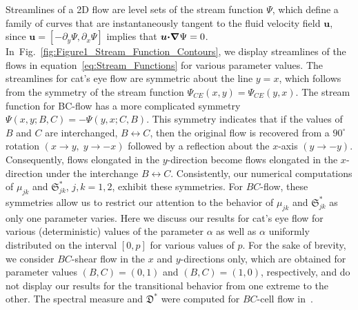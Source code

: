 \documentclass[english,12pt,jmp,graphicx]{revtex4-1}
\newcommand{\vecu}{\boldsymbol{u}}
\newcommand{\figref}[1]{Fig.~\ref{#1}}
\newcommand{\bnabla}{\mbox{\boldmath${\nabla}$}}
\newcommand{\bcdot}{\mbox{\boldmath${\cdot}$}}
\newcommand{\Vc}{\mathcal{V}}
\newcommand{\Sg}{\mathfrak{S}}
\newcommand{\Dg}{\mathfrak{D}}
\newcommand{\Hc}{\mathcal{H}}
\begin{document}
Streamlines of a 2D flow are level sets of the stream function
$\Psi$, which define a family of curves that are instantaneously tangent
to the fluid velocity field $\vecu$, since $\vecu=[-\partial_y\Psi,\partial_x\Psi]$
implies that
$\vecu\bcdot\bnabla\Psi=0$. In~\figref{fig:Figure1_Stream_Function_Contours},   
we display streamlines of the flows
in equation~\eqref{eq:Stream_Functions} for various parameter values.
The streamlines for cat's eye flow are symmetric
about the line $y=x$, which follows from the symmetry of the stream
function $\Psi_{CE}(x,y)=\Psi_{CE}(y,x)$. The stream function
for BC-flow has a more complicated symmetry
$\Psi(x,y;B,C)=-\Psi(y,x;C,B)$. This symmetry indicates that if the values
of $B$ and $C$ are interchanged, $B\longleftrightarrow C$, then the original flow is
recovered from a $90^\circ$ rotation $(x\to y,\;y\to-x)$ followed by a
reflection about the $x$-axis $(y\to-y)$. Consequently, flows elongated
in the $y$-direction become flows elongated in the $x$-direction under
the interchange $B\longleftrightarrow C$. Consistently, our numerical
computations of $\mu_{jk}$ and $\Sg_{jk}^*$, $j,k=1,2$, exhibit these
symmetries. For $BC$-flow, these symmetries allow us to restrict our
attention to the behavior of $\mu_{jk}$ and $\Sg_{jk}^*$ as only one
parameter varies. Here we discuss our results for cat's eye flow for
various (deterministic) values of the parameter $\alpha$ as well as $\alpha$ uniformly
distributed on the interval $[0,p]$ for various values of $p$.
For the sake of brevity, we consider $BC$-shear flow in the $x$ and
$y$-directions only, which are obtained for parameter values
$(B,C)=(0,1)$ and $(B,C)=(1,0)$, respectively, and do not display our
results for the transitional behavior from one extreme to the
other. The spectral measure and $\Dg^*$ were computed for $BC$-cell
flow in~\cite{Murphy:ADSTPF-2017}.  


\end{document}
